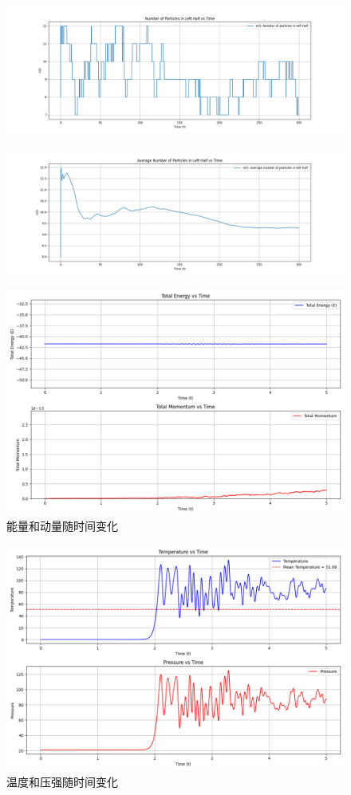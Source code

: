 \documentclass[11pt]{article}
\begin{document}
\begin{question}
\begin{figure}[H]
  \centering
  \includegraphics[width=0.7\columnwidth]{1/c1.png}
\end{figure}
\begin{figure}[H]
  \centering
  \includegraphics[width=0.7\columnwidth]{1/c2.png}
\end{figure}

\begin{figure}[H]
  \centering
  \includegraphics[width=0.7\columnwidth]{1/d1.png}
  \caption{能量和动量随时间变化}
\end{figure}
\begin{figure}[H]
  \centering
  \includegraphics[width=0.7\columnwidth]{1/d2.png}
  \caption{温度和压强随时间变化}
\end{figure}


\end{question}
\end{document}
